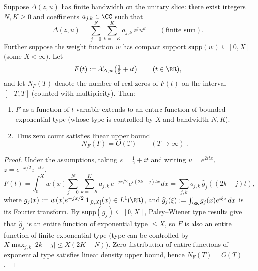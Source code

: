 \begin{proposition}[Zero Density Upper Bound for Finite Bandwidth/Finite Scale: \texorpdfstring{$N(T)=O(T)$}{N(T)=O(T)}]\label{prop:xi-scale-mellin-zero-density-upper}
Suppose \(\Delta(z,u)\) has finite bandwidth on the unitary slice: there exist integers \(N,K\ge 0\) and coefficients \(a_{j,k}\in\CC\) such that
\[
\Delta(z,u)=\sum_{j=0}^{N}\sum_{k=-K}^{K} a_{j,k}\,z^j u^k
\qquad(\text{finite sum}).
\]
Further suppose the weight function \(w\) has compact support \(\mathrm{supp}(w)\subseteq [0,X]\) (some \(X<\infty\)).
Let
\[
F(t):=\mathcal X_{\Delta,w}\!\left(\tfrac12+it\right)\qquad(t\in\RR),
\]
and let \(N_F(T)\) denote the number of real zeros of \(F(t)\) on the interval \([-T,T]\) (counted with multiplicity).
Then:
\begin{enumerate}
  \item \(F\) as a function of \(t\)-variable extends to an entire function of bounded exponential type (whose type is controlled by \(X\) and bandwidth \(N,K\)).
  \item Thus zero count satisfies linear upper bound
  \[
  \boxed{\ N_F(T)=O(T)\qquad(T\to\infty)\ }.
  \]
\end{enumerate}
\end{proposition}
\begin{proof}
Under the assumptions, taking \(s=\tfrac12+it\) and writing \(u=e^{2itx}\), \(z=e^{-x/2}e^{-itx}\),
\[
F(t)=\int_0^X w(x)\sum_{j=0}^{N}\sum_{k=-K}^{K} a_{j,k}\,e^{-jx/2}\,e^{i(2k-j)tx}\,dx
=\sum_{j,k}a_{j,k}\,\widehat g_{j}( (2k-j)t),
\]
where \(g_j(x):=w(x)e^{-jx/2}\,\mathbf{1}_{[0,X]}(x)\in L^1(\RR)\), and \(\widehat g_j(\xi):=\int_{\RR} g_j(x)e^{i\xi x}\,dx\) is its Fourier transform.
By \(\mathrm{supp}(g_j)\subseteq[0,X]\), Paley--Wiener type results give that \(\widehat g_j\) is an entire function of exponential type \(\le X\), so \(F\) is also an entire function of finite exponential type (type can be controlled by \(X\max_{j,k}|2k-j|\le X(2K+N)\)).
Zero distribution of entire functions of exponential type satisfies linear density upper bound, hence \(N_F(T)=O(T)\).
\end{proof}



